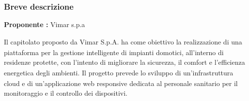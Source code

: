 \documentclass[a4paper,11pt]{article}
\begin{document}
\subsubsection{Breve descrizione}
\textbf{Proponente\textsubscript{}
:} Vimar s.p.a
\vspace{0.5em}\\
\parbox[t]{\linewidth}{%
Il capitolato\textsubscript{}
 proposto da Vimar S.p.A. ha come obiettivo la realizzazione di una piattaforma per la gestione intelligente di impianti domotici, all'interno di residenze protette, con l'intento di migliorare la sicurezza\textsubscript{}, il comfort e l'efficienza energetica degli ambienti. Il progetto\textsubscript{}
 prevede lo sviluppo di un'infrastruttura cloud e di un'applicazione web responsive dedicata al personale sanitario per il monitoraggio e il controllo dei dispositivi.
}
\end{document}
